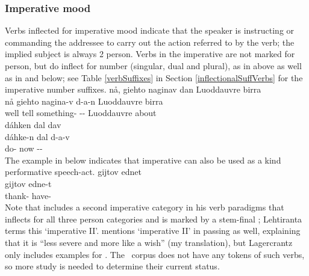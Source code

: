 \subsubsection{Imperative mood}\label{IMPmood}
Verbs inflected for imperative mood indicate that the speaker is instructing or commanding the addressee to carry out the action referred to by the verb; the implied subject is always 2 person. Verbs in the imperative are not marked for person, but do inflect for number (singular, dual and plural), as in  above as well as in  and  below; see Table \vref{verbSuffixes} in Section \ref{inflectionalSuffVerbs} for the imperative number suffixes. %
\ea\label{imperativeEx1}%
\glll	nå, giehto naginav dan Luoddauvre birra\\
	nå giehto nagina-v d-a-n Luoddauvre birra\\
	well tell\BS{} something- -- Luoddauvre\BS{} about\\\nopagebreak
{}	
\z
\ea\label{imperativeEx2}%
\glll	dáhken dal dav\\
	dáhke-n dal d-a-v\\
	do- now --\\\nopagebreak
{}	
\z
The example in  below indicates that imperative can also be used as a kind performative speech-act. 
\ea\label{imperativeEx3}%
\glll	gijtov ednet\\
	gijtov edne-t\\
	thank- have-\\\nopagebreak
{}	
\z
Note that \citet[150-155]{Lehtiranta1992} includes  a second imperative category in his verb paradigms that inflects for all three person categories and is marked by a stem-final ; Lehtiranta terms this ‘imperative II’. \citet[22]{Lagercrantz1926} mentions ‘imperative II’ in passing as well, explaining that it is “less severe and more like a wish” (my translation), but  Lagercrantz only includes examples for \SGs. %
The \PSDP\ corpus does not have any tokens of such verbs, so more study is needed to determine their current status. 



